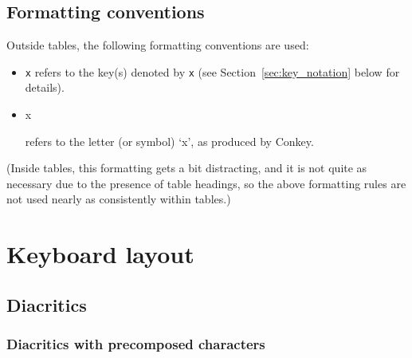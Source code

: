 \documentclass[oneside]{memoir}
\newcommand{\key}{\verb}
\newcommand{\out}[1]{\colorbox{gray!20}{\strut{}#1}}
\begin{document}
\section{Formatting conventions}
\label{sec:formatting}

Outside tables, the following formatting conventions are used:

\begin{itemize}[noitemsep]
\item \key|x| refers to the key(s) denoted by \key|x| (see Section~\ref{sec:key_notation} below for details).
\item \out{x} refers to the letter (or symbol) `x', as produced by Conkey.
\end{itemize}

(Inside tables, this formatting gets a bit distracting, and it is not quite as necessary due to the presence of table headings,
  so the above formatting rules are not used nearly as consistently within tables.)

\chapter{Keyboard layout}
\label{sec:keyboard_layout}

\section{Diacritics}
\label{sec:diacritics}

\subsection{Diacritics with precomposed characters}
\label{sec:diacritics_with_precomposed_characters}
\end{document}
